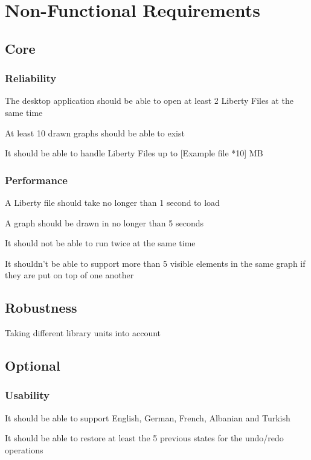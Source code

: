 \documentclass[10pt,a4paper]{report}
\begin{document}
\section{Non-Functional Requirements}
\subsection{Core}
\subsubsection{Reliability}
\begin{NFR-Rel}
    \item The desktop application should be able to open at least 2 Liberty Files at the same time
    \item At least 10 drawn graphs should be able to exist
    \item It should be able to handle Liberty Files up to [Example file *10] MB
\end{NFR-Rel}

\subsubsection{Performance}
\begin{NFR-Perf}
    \item A Liberty file should take no longer than 1 second to load
    \item A graph should be drawn in no longer than 5 seconds
    \item It should not be able to run twice at the same time
    \item It shouldn’t be able to support more than 5 visible elements in the same graph if they are put on top of one another
\end{NFR-Perf}

\subsection{Robustness}
\begin{NFR-Rob}
    \item Taking different library units into account
\end{NFR-Rob}

\subsection{Optional}
\subsubsection{Usability}
\begin{NFRO-Usability}
    \item It should be able to support English, German, French, Albanian and Turkish
    \item It should be able to restore at least the 5 previous states for the undo/redo operations 
\end{NFRO-Usability}
\end{document}
